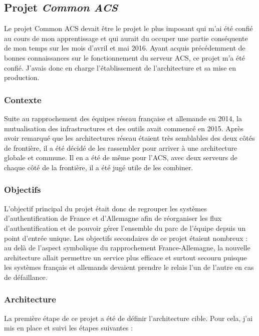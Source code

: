 \documentclass[a4paper,12pt]{report}
\begin{document}
\subsection{Projet \textit{Common ACS}}
Le projet Common ACS devait être le projet le plus imposant qui m'ai été confié au cours de mon apprentissage et qui aurait du occuper une partie conséquente de mon temps sur les mois d'avril et mai 2016. Ayant acquis précédemment de bonnes connaissances sur le fonctionnement du serveur ACS, ce projet m'a été confié. J'avais donc en charge l'établissement de l'architecture et sa mise en production.
\subsubsection{Contexte}
Suite au rapprochement des équipes réseau française et allemande en 2014, la mutualisation des infrastructures et des outils avait commencé en 2015. Après avoir remarqué que les architectures réseau étaient très semblables des deux côtés de frontière, il a été décidé de les rassembler pour arriver à une architecture globale et commune. Il en a été de même pour l'ACS, avec deux serveurs de chaque côté de la frontière, il a été jugé utile de les combiner.
\subsubsection{Objectifs}
L'objectif principal du projet était donc de regrouper les systèmes d'authentification de France et d'Allemagne afin de réorganiser les flux d'authentification et de pouvoir gérer l'ensemble du parc de l'équipe depuis un point d'entrée unique. Les objectifs secondaires de ce projet étaient nombreux : au delà de l'aspect symbolique du rapprochement France-Allemagne, la nouvelle architecture allait permettre un service plus efficace et surtout secouru puisque les systèmes français et allemands devaient prendre le relais l'un de l'autre en cas de défaillance.
\subsubsection{Architecture}
La première étape de ce projet a été de définir l'architecture cible. Pour cela, j'ai mis en place et suivi les étapes suivantes :
\end{document}
